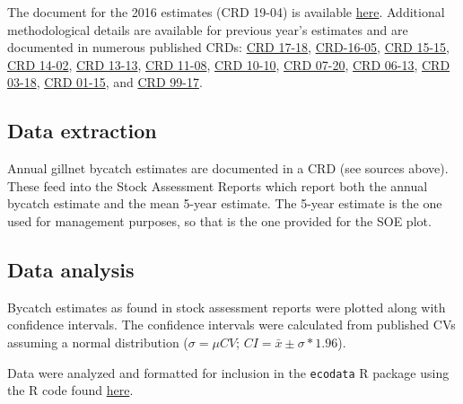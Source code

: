 \documentclass[
]{book}
\begin{document}
The document for the 2016 estimates (CRD 19-04) is available \href{https://www.nefsc.noaa.gov/publications/crd/crd1904/crd1904.pdf}{here}. Additional methodological details are available for previous year's estimates and are documented in numerous published CRDs: \href{https://www.nefsc.noaa.gov/publications/crd/crd1718/crd1718.pdf}{CRD 17-18}, \href{https://www.nefsc.noaa.gov/publications/crd/crd1605/crd1605.pdf}{CRD-16-05}, \href{https://www.nefsc.noaa.gov/publications/crd/crd1515/crd1515.pdf}{CRD 15-15}, \href{https://repository.library.noaa.gov/view/noaa/4718}{CRD 14-02}, \href{https://www.nefsc.noaa.gov/publications/crd/crd1313/crd1313_2nd_ed.pdf}{CRD 13-13}, \href{https://www.nefsc.noaa.gov/publications/crd/crd1108/1108.pdf}{CRD 11-08}, \href{https://www.nefsc.noaa.gov/publications/crd/crd1010/crd1010.pdf}{CRD 10-10}, \href{https://www.nefsc.noaa.gov/publications/crd/crd0720/crd0720.pdf}{CRD 07-20}, \href{https://www.nefsc.noaa.gov/publications/crd/crd0613/crd0613.pdf}{CRD 06-13}, \href{https://www.nefsc.noaa.gov/publications/crd/crd0318/crd0318.pdf}{CRD 03-18}, \href{https://www.nefsc.noaa.gov/publications/crd/crd0115/0115.pdf}{CRD 01-15}, and \href{https://www.nefsc.noaa.gov/publications/crd/pdfs/crd9917.pdf}{CRD 99-17}.

\hypertarget{data-extraction-15}{%
\subsection{Data extraction}\label{data-extraction-15}}

Annual gillnet bycatch estimates are documented in a CRD (see sources above). These feed into the Stock Assessment Reports which report both the annual bycatch estimate and the mean 5-year estimate. The 5-year estimate is the one used for management purposes, so that is the one provided for the SOE plot.

\hypertarget{data-analysis-17}{%
\subsection{Data analysis}\label{data-analysis-17}}

Bycatch estimates as found in stock assessment reports were plotted along with confidence intervals. The confidence intervals were calculated from published CVs assuming a normal distribution (\(\sigma = \mu CV\); \(CI = \bar{x} \pm \sigma * 1.96\)).

Data were analyzed and formatted for inclusion in the \texttt{ecodata} R package using the R code found \href{https://raw.githubusercontent.com/NOAA-EDAB/ecodata/master/data-raw/get_harborporpoise.R}{here}.
\end{document}
